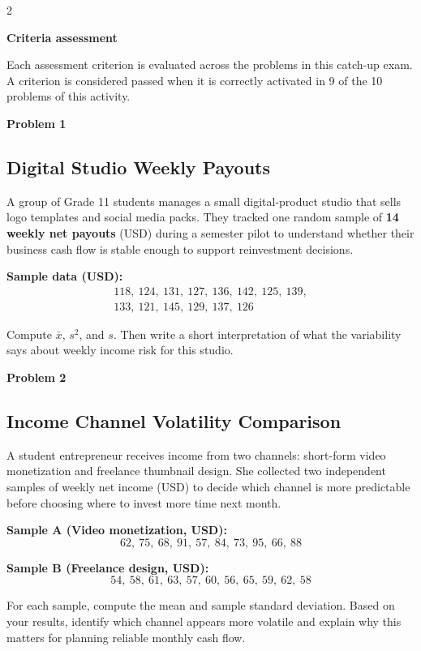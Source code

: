 \documentclass[12pt]{article}
\newcommand{\SubsectionBox}[1]{%
\noindent\colorbox{gray!30}{\parbox{\linewidth}{\textbf{#1}}}\par\vspace{0.35cm}%
}
\begin{document}
\begin{multicols}{2}
	\SubsectionBox{Criteria assessment}\vspace{-0.25cm}
	Each assessment criterion is evaluated across the problems in this catch-up exam. A criterion is considered passed when it is correctly activated in 9 of the 10 problems of this activity.

	\vspace{0.25cm}
\SubsectionBox{Problem 1}
\subsection*{Digital Studio Weekly Payouts}
A group of Grade 11 students manages a small digital-product studio that sells logo templates and social media packs. They tracked one random sample of \textbf{14 weekly net payouts} (USD) during a semester pilot to understand whether their business cash flow is stable enough to support reinvestment decisions.

		\textbf{Sample data (USD):}
		\[
		\begin{aligned}
			118,\ 124,\ 131,\ 127,\ 136,\ 142,\ 125,\ 139,\\
			133,\ 121,\ 145,\ 129,\ 137,\ 126
		\end{aligned}
		\]

		Compute $\bar{x}$, $s^2$, and $s$. Then write a short interpretation of what the variability says about weekly income risk for this studio.

\vspace{0.5cm}
\SubsectionBox{Problem 2}
\subsection*{Income Channel Volatility Comparison}
A student entrepreneur receives income from two channels: short-form video monetization and freelance thumbnail design. She collected two independent samples of weekly net income (USD) to decide which channel is more predictable before choosing where to invest more time next month.

		\textbf{Sample A (Video monetization, USD):}
		\[62,\ 75,\ 68,\ 91,\ 57,\ 84,\ 73,\ 95,\ 66,\ 88\]

		\textbf{Sample B (Freelance design, USD):}
		\[54,\ 58,\ 61,\ 63,\ 57,\ 60,\ 56,\ 65,\ 59,\ 62,\ 58\]

		For each sample, compute the mean and sample standard deviation. Based on your results, identify which channel appears more volatile and explain why this matters for planning reliable monthly cash flow.


\end{multicols}
\end{document}
